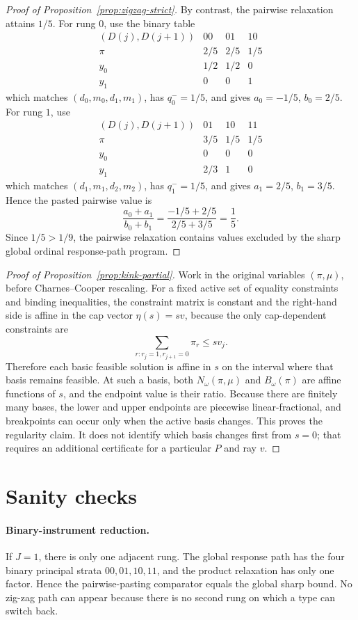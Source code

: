 \documentclass[11pt]{article}
\theoremstyle{definition}
\theoremstyle{plain}
\theoremstyle{remark}
\begin{document}
\begin{proof}[Proof of Proposition~\ref{prop:zigzag-strict}]
By contrast, the pairwise relaxation attains \(1/5\).  For rung \(0\), use the
binary table
\[
\begin{array}{c|ccc}
(D(j),D(j+1))&00&01&10\\ \hline
\pi&2/5&2/5&1/5\\
y_0&1/2&1/2&0\\
y_1&0&0&1
\end{array}
\]
which matches \((d_0,m_0,d_1,m_1)\), has \(q^-_0=1/5\), and gives
\(a_0=-1/5\), \(b_0=2/5\).  For rung \(1\), use
\[
\begin{array}{c|ccc}
(D(j),D(j+1))&01&10&11\\ \hline
\pi&3/5&1/5&1/5\\
y_0&0&0&0\\
y_1&2/3&1&0
\end{array}
\]
which matches \((d_1,m_1,d_2,m_2)\), has \(q^-_1=1/5\), and gives
\(a_1=2/5\), \(b_1=3/5\).  Hence the pasted pairwise value is
\[
\frac{a_0+a_1}{b_0+b_1}
=\frac{-1/5+2/5}{2/5+3/5}
=\frac15.
\]
Since \(1/5>1/9\), the pairwise relaxation contains values excluded by the
sharp global ordinal response-path program.
\end{proof}

\begin{proof}[Proof of Proposition~\ref{prop:kink-partial}]
Work in the original variables \((\pi,\mu)\), before Charnes--Cooper
rescaling.  For a fixed active set of equality constraints and binding
inequalities, the constraint matrix is constant and the right-hand side is
affine in the cap vector \(\eta(s)=s v\), because the only cap-dependent
constraints are
\[
\sum_{r:r_j=1,r_{j+1}=0}\pi_r\le s v_j.
\]
Therefore each basic feasible solution is affine in \(s\) on the interval
where that basis remains feasible.  At such a basis, both
\(N_\omega(\pi,\mu)\) and \(B_\omega(\pi)\) are affine functions of \(s\), and
the endpoint value is their ratio.  Because there are finitely many bases, the
lower and upper endpoints are piecewise linear-fractional, and breakpoints can
occur only when the active basis changes.  This proves the regularity claim.
It does not identify which basis changes first from \(s=0\); that requires an
additional certificate for a particular \(P\) and ray \(v\).
\end{proof}

\section{Sanity checks}
\paragraph{Binary-instrument reduction.}
If \(J=1\), there is only one adjacent rung.  The global response path has the
four binary principal strata \(00,01,10,11\), and the product relaxation has
only one factor.  Hence the pairwise-pasting comparator equals the global
sharp bound.  No zig-zag path can appear because there is no second rung on
which a type can switch back.
\end{document}
